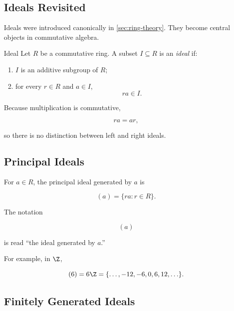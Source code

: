 \subsection{Ideals Revisited}
\label{subsec:commutative-ideals}

Ideals were introduced canonically in \cref{sec:ring-theory}. They become
central objects in commutative algebra.

\begin{definitionbox}{Ideal}
Let \(R\) be a commutative ring. A subset \(I\subseteq R\) is an
\emph{ideal} if:
\begin{enumerate}
    \item \(I\) is an additive subgroup of \(R\);
    \item for every \(r\in R\) and \(a\in I\),
    \[ ra\in I. \]
\end{enumerate}
\end{definitionbox}

Because multiplication is commutative,

\[ ra=ar, \]

so there is no distinction between left and right ideals.

\subsection{Principal Ideals}
\label{subsec:commutative-principal-ideals}

For \(a\in R\), the principal ideal generated by \(a\) is

\[ (a)=\{ra:r\in R\}. \]

The notation

\[ (a) \]

is read ``the ideal generated by \(a\).''

For example, in \(\Z\),

\[ (6)=6\Z=\{\ldots,-12,-6,0,6,12,\ldots\}. \]

\subsection{Finitely Generated Ideals}
\label{subsec:finitely-generated-ideals}

